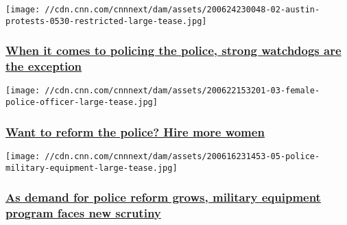 \href{/2020/06/25/us/police-reform-civilian-oversight-invs/index.html}{}

\texttt{[image: //cdn.cnn.com/cnnnext/dam/assets/200624230048-02-austin-protests-0530-restricted-large-tease.jpg]}

\hypertarget{when-it-comes-to-policing-the-police-strong-watchdogs-are-the-exception-}{%
\subsubsection{\texorpdfstring{\href{/2020/06/25/us/police-reform-civilian-oversight-invs/index.html}{When
it comes to policing the police, strong watchdogs are the exception
}}{When it comes to policing the police, strong watchdogs are the exception }}\label{when-it-comes-to-policing-the-police-strong-watchdogs-are-the-exception-}}

\href{/2020/06/23/us/protests-police-reform-women-policing-invs/index.html}{}

\texttt{[image: //cdn.cnn.com/cnnnext/dam/assets/200622153201-03-female-police-officer-large-tease.jpg]}

\hypertarget{want-to-reform-the-police-hire-more-women-}{%
\subsubsection{\texorpdfstring{\href{/2020/06/23/us/protests-police-reform-women-policing-invs/index.html}{Want
to reform the police? Hire more women
}}{Want to reform the police? Hire more women }}\label{want-to-reform-the-police-hire-more-women-}}

\href{/2020/06/17/politics/protests-police-reform-military-supplies-invs/index.html}{}

\texttt{[image: //cdn.cnn.com/cnnnext/dam/assets/200616231453-05-police-military-equipment-large-tease.jpg]}

\hypertarget{as-demand-for-police-reform-grows-military-equipment-program-faces-new-scrutiny-}{%
\subsubsection{\texorpdfstring{\href{/2020/06/17/politics/protests-police-reform-military-supplies-invs/index.html}{As
demand for police reform grows, military equipment program faces new
scrutiny
}}{As demand for police reform grows, military equipment program faces new scrutiny }}\label{as-demand-for-police-reform-grows-military-equipment-program-faces-new-scrutiny-}}

